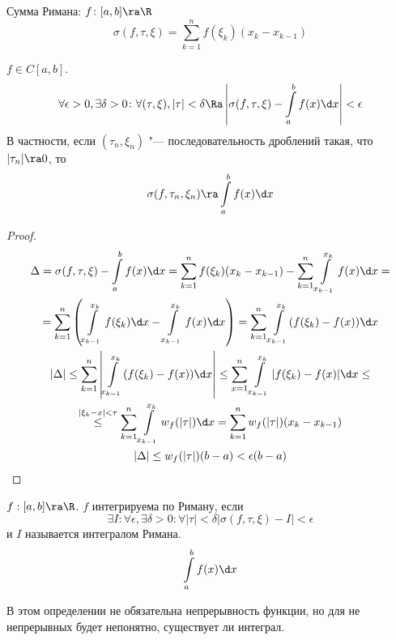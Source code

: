 \begin{Def}
	Сумма Римана: $f\colon [a, b] \ra \R$
	\[ \sigma(f, \tau, \xi) = \sum_{k = 1}^n f(\xi_k) \left(x_k - x_{k - 1}\right) \]
\end{Def}

\begin{theorem}
	$f \in C[a, b]$.
	\[ \forall \epsilon > 0, \exists \delta > 0\colon \forall (\tau, \xi), |\tau| < \delta \Ra \left|\sigma(f, \tau, \xi) - \int\limits_a^bf(x)\d x\right| < \epsilon \]
	В частности, если $(\tau_n, \xi_n)$ "--- последовательность дроблений такая, что $|\tau_n| \ra 0$, то
	\[ \sigma(f, \tau_n, \xi_n) \ra \int\limits_a^bf(x)\d x \]
\end{theorem}
\begin{proof}
	\begin{gather*}
		\Delta = \sigma(f, \tau, \xi) - \int\limits_a^bf(x)\d x = \sum\limits_{k = 1}^nf(\xi_k)(x_k - x_{k - 1}) - \sum\limits_{k = 1}^n
		\int\limits_{x_{k - 1}}^{x_k}f(x) \d x = \\
		= \sum\limits_{k = 1}^n\left(\int\limits_{x_{k - 1}}^{x_k}f(\xi_k)\d x - \int\limits_{x_{k - 1}}^{x_k} f(x) \d x\right) =
		\sum\limits_{k = 1}^n\int\limits_{x_{k - 1}}^{x_k}(f(\xi_k) - f(x))\d x \\
		|\Delta| \le \sum\limits_{k = 1}^n\left|\int\limits_{x_{k - 1}}^{x_k}(f(\xi_k) - f(x))\d x \right| \le \sum\limits_{x = 1}^n
		\int\limits_{x_{k - 1}}^{x_k}|f(\xi_k) - f(x)|\d x \le \\
		\stackrel{|\xi_k - x| < \tau}{\le} \sum\limits_{k = 1}^n\int\limits_{x_{k - 1}}^{x_k}w_f(|\tau|)\d x = \sum\limits_{k = 1}^nw_f(|\tau|)(x_k - x_{k - 1}) \\
		|\Delta| \le w_f(|\tau|)(b - a) < \epsilon(b - a)
	\end{gather*}
\end{proof}

\begin{Def}
	$f:[a, b] \ra \R$.
	$f$ интегрируема по Риману, если
	\[ \exists I \colon \forall \epsilon, \exists \delta > 0\colon \forall |\tau| < \delta |\sigma(f, \tau, \xi) - I| < \epsilon \]
	и $I$ называется интегралом Римана.
	\[ \int\limits_a^bf(x)\d x \]
\end{Def}
\begin{Rem}
	В этом определении не обязательна непрерывность функции, но для не непрерывных будет непонятно, существует ли интеграл.
\end{Rem}
